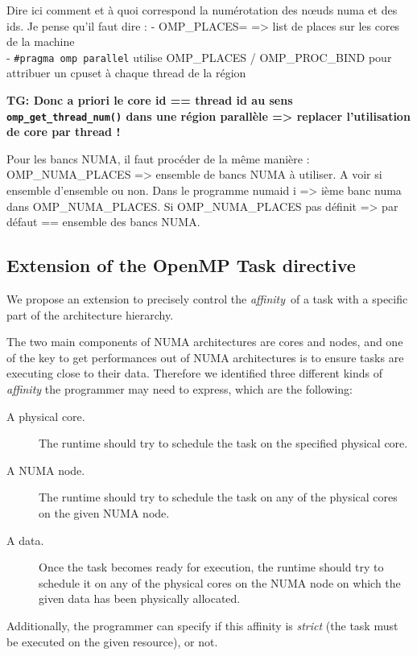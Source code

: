 \documentclass{Styles/llncs}
\newcommand{\TG}[1]{{\color{red}\bfseries TG: #1}}
\begin{document}
Dire ici comment et à quoi correspond la numérotation des nœuds numa et des ids.
Je pense qu'il faut dire :
- OMP\_PLACES= => list de places sur les cores de la machine\\
- \texttt{\#pragma omp parallel} utilise OMP\_PLACES / OMP\_PROC\_BIND pour attribuer un cpuset à chaque thread de la région

\TG{Donc a priori le core id == thread id au sens \texttt{omp\_get\_thread\_num()} dans une région parallèle => replacer l'utilisation de core par thread !}

Pour les bancs NUMA, il faut procéder de la même manière : 
OMP\_NUMA\_PLACES => ensemble de bancs NUMA à utiliser. A voir si ensemble d'ensemble ou non.
Dans le programme numaid i => ième banc numa dans OMP\_NUMA\_PLACES.
Si OMP\_NUMA\_PLACES pas définit => par défaut == ensemble des bancs NUMA.

\subsection{Extension of the OpenMP Task directive}

We propose an extension to precisely control the \emph{affinity} of a task with a specific part of the architecture hierarchy.

The two main components of NUMA architectures are cores and nodes, and one of
the key to get performances out of NUMA architectures is to ensure tasks are
executing close to their data.
Therefore we identified three different kinds of \emph{affinity} the programmer
may need to express, which are the following:
\begin{description}
    \item [A physical core.]
      The runtime should try to schedule the task on the specified physical core.

    \item [A NUMA node.]
      The runtime should try to schedule the task on any of the physical cores on
      the given NUMA node.

    \item [A data.]
      Once the task becomes ready for execution, the runtime should try to schedule it on any of the physical cores on
      the NUMA node on which the given data has been physically allocated.
\end{description}

Additionally, the programmer can specify if this affinity is \emph{strict} (the task must be executed on the given resource), or not.
\end{document}
